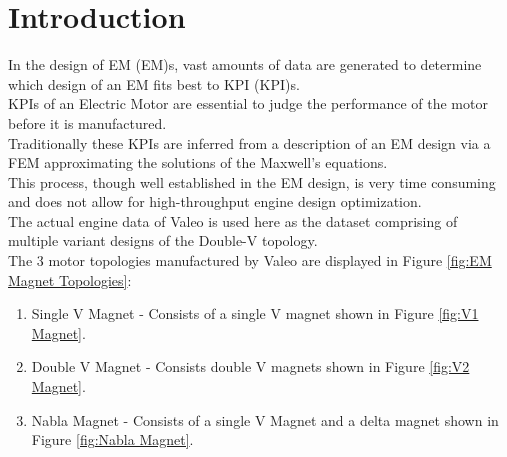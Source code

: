 \documentclass{report} %
\begin{document}
\newpage

\newpage

\chapter{Introduction} 
In the design of \acl{EM} (\ac{EM})s, vast amounts of data are generated to determine which design of an \ac{EM} fits best to \acl{KPI} (\ac{KPI})s. \\
\ac{KPI}s of an Electric Motor are essential to judge the performance of the motor before it is manufactured. \\
Traditionally these \ac{KPI}s are inferred from a description of an \ac{EM} design via a \ac{FEM} approximating the solutions of the Maxwell’s equations. \\
This process, though well established in the \ac{EM} design, is very time consuming and does not allow for high-throughput engine design optimization. \\
The actual engine data of Valeo is used here as the dataset comprising of multiple variant designs of the Double-V topology.\\

The 3 motor topologies manufactured by Valeo are displayed in Figure \ref{fig:EM Magnet Topologies}:
\begin{enumerate}
    \item Single V Magnet - Consists of a single V magnet shown in Figure \ref{fig:V1 Magnet}.
    \item Double V Magnet - Consists double V magnets shown in Figure \ref{fig:V2 Magnet}.
    \item Nabla Magnet - Consists of a single V Magnet and a delta magnet shown in Figure \ref{fig:Nabla Magnet}.
\end{enumerate}
\end{document}
